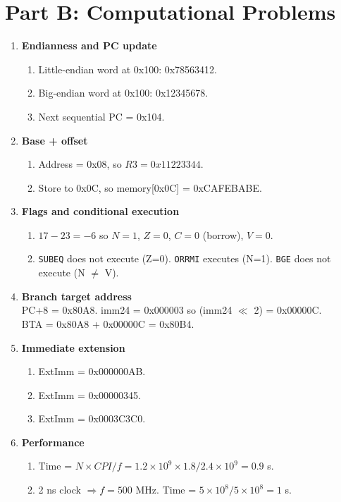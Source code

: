 \documentclass[11pt]{article}
\begin{document}
\section*{Part B: Computational Problems}
\begin{enumerate}[label=\textbf{B\arabic*.}]
  \item \textbf{Endianness and PC update}
  \begin{enumerate}[label=(\alph*)]
    \item Little-endian word at 0x100: 0x78563412.
    \item Big-endian word at 0x100: 0x12345678.
    \item Next sequential PC = 0x104.
  \end{enumerate}

  \item \textbf{Base + offset}
  \begin{enumerate}[label=(\alph*)]
    \item Address = 0x08, so $R3 = 0x11223344$.
    \item Store to 0x0C, so memory[0x0C] = 0xCAFEBABE.
  \end{enumerate}

  \item \textbf{Flags and conditional execution}
  \begin{enumerate}[label=(\alph*)]
    \item $17-23=-6$ so $N=1$, $Z=0$, $C=0$ (borrow), $V=0$.
    \item \texttt{SUBEQ} does not execute (Z=0). \texttt{ORRMI} executes (N=1). \texttt{BGE} does not execute (N $\neq$ V).
  \end{enumerate}

  \item \textbf{Branch target address}
  \\[0.5ex]
  PC+8 = 0x80A8. imm24 = 0x000003 so (imm24 $\ll$ 2) = 0x00000C.\\
  BTA = 0x80A8 + 0x00000C = 0x80B4.

  \item \textbf{Immediate extension}
  \begin{enumerate}[label=(\alph*)]
    \item ExtImm = 0x000000AB.
    \item ExtImm = 0x00000345.
    \item ExtImm = 0x0003C3C0.
  \end{enumerate}

  \item \textbf{Performance}
  \begin{enumerate}[label=(\alph*)]
    \item Time = $N \times CPI / f = 1.2\times 10^9 \times 1.8 / 2.4\times 10^9 = 0.9$ s.
    \item 2 ns clock $\Rightarrow f=500$ MHz. Time = $5\times 10^8 / 5\times 10^8 = 1$ s.
  \end{enumerate}
\end{enumerate}
\end{document}
